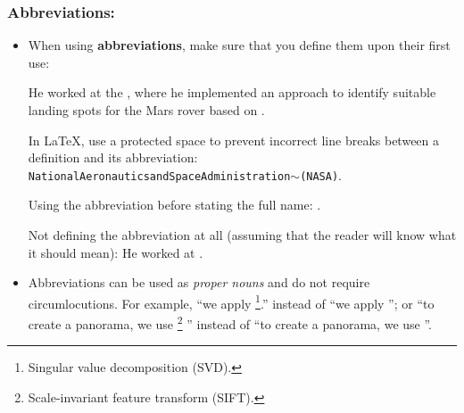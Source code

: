 \documentclass[11pt,a4paper]{article}
\begin{document}
\subsubsection*{Abbreviations:}
\begin{itemize}
  \item When using \textbf{abbreviations}, make sure that you define them upon 
their first use:
  \vspace{-1.5em}
  \begin{goodexample}
    He worked at the , where he implemented an approach to identify suitable landing spots for the Mars rover based on .
    
    In \LaTeX, use a protected space to prevent incorrect line breaks between a definition and its abbreviation: \\\texttt{National{\textvisiblespace}Aeronautics{\textvisiblespace}and{\textvisiblespace}Space{\textvisiblespace}Administration$\sim$(NASA)}.
  \end{goodexample}
  \vspace{-2em}
  \begin{badexample}
    Using the abbreviation before stating the full name: .
    
    Not defining the abbreviation at all (assuming that the reader will know what it should mean): He worked at .
  \end{badexample}
  
  \item Abbreviations can be used as \emph{proper nouns} and do not require circumlocutions.
  For example, ``we apply \footnote{Singular value decomposition (SVD).}.'' instead of ``we apply ''; or ``to create a panorama, we use \footnote{Scale-invariant feature transform (SIFT).} '' instead of ``to create a panorama, we use ''.

\end{itemize}
\end{document}
